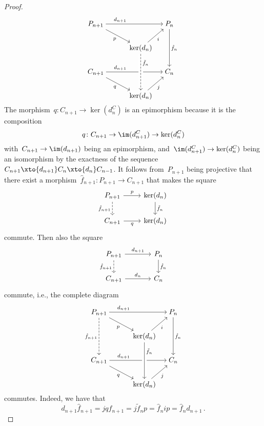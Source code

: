 \begin{proof}
  \[
    \begin{tikzcd}[column sep = small, cramped]
        P_{n+1}
        \arrow{rrr}[above, near start]{d_{n+1}}
        \arrow{drr}[below left]{p}
      & {}
      & {}
      & P_n
        \arrow{dd}[right]{\hat{f}_n}
      \\
        {}
      & {}
      & \ker(d_n)
        \arrow{ur}[below right]{i}
      & {}
      \\
        C_{n+1}
        \arrow{rrr}[above, near start]{d_{n+1}}
        \arrow{drr}[below left]{q}
      & {}
      & {}
      & C_n
      \\
        {}
      & {}
      & \ker(d_n)
        \arrow[dashed, from=uu, crossing over, "\tilde{f}_n", right, near start]
        \arrow{ur}[below right]{j}
      & {}
    \end{tikzcd}
  \]
  The morphism~$q \colon C_{n+1} \to \ker(d^C_n)$ is an epimorphism because it is the composition
  \[
    q
    \colon
    C_{n+1}
    \to
    \im(d^C_{n+1})
    \to
    \ker(d^C_n)
  \]
  with~$C_{n+1} \to \im(d_{n+1})$ being an epimorphism, and~$\im(d^C_{n+1}) \to \ker(d^C_n)$ being an isomorphism by the exactness of the sequence~$C_{n+1} \xto{d_{n+1}} C_n \xto{d_n} C_{n-1}$.
  It follows from~$P_{n+1}$ being projective that there exist a morphism~$\hat{f}_{n+1} \colon P_{n+1} \to C_{n+1}$ that makes the square
  \[
    \begin{tikzcd}
        P_{n+1}
        \arrow{r}[above]{p}
        \arrow[dashed]{d}[left]{\hat{f}_{n+1}}
      & \ker(d_n)
        \arrow{d}[right]{\tilde{f}_n}
      \\
        C_{n+1}
        \arrow{r}[below]{q}
      & \ker(d_n)
    \end{tikzcd}
  \]
  commute.
  Then also the square
  \[
    \begin{tikzcd}[column sep = large]
        P_{n+1}
        \arrow{r}[above]{d_{n+1}}
        \arrow[dashed]{d}[left]{\hat{f}_{n+1}}
      & P_n
        \arrow{d}[right]{\hat{f}_n}
      \\
        C_{n+1}
        \arrow{r}[above]{d_n}
      & C_n
    \end{tikzcd}
  \]
  commute, i.e., the complete diagram
  \[
    \begin{tikzcd}[column sep = small, cramped]
        P_{n+1}
        \arrow{rrr}[above, near start]{d_{n+1}}
        \arrow{drr}[below left]{p}
        \arrow[dashed]{dd}[left]{\hat{f}_{n+1}}
      & {}
      & {}
      & P_n
        \arrow{dd}[right]{\hat{f}_n}
      \\
        {}
      & {}
      & \ker(d_n)
        \arrow{ur}[below right]{i}
      & {}
      \\
        C_{n+1}
        \arrow{rrr}[above, near start]{d_{n+1}}
        \arrow{drr}[below left]{q}
      & {}
      & {}
      & C_n
      \\
        {}
      & {}
      & \ker(d_n)
        \arrow[from=uu, crossing over, "\tilde{f}_n", right, near start]
        \arrow{ur}[below right]{j}
      & {}
    \end{tikzcd}
  \]
  commutes.
  Indeed, we have that
  \[
      d_{n+1} \hat{f}_{n+1}
    = j q \hat{f}_{n+1}
    = j \tilde{f}_n p
    = \hat{f}_n i p
    = \hat{f}_n d_{n+1} \,.
  \]
  

\end{proof}
